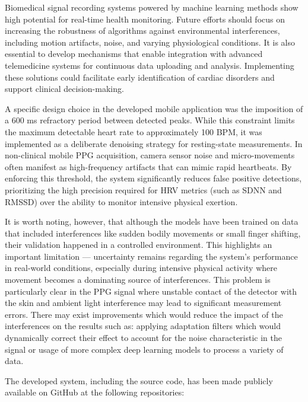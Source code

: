 \documentclass{citask}
\begin{document}
Biomedical signal recording systems powered by machine learning methods show high potential for real-time health monitoring. Future efforts should focus on increasing the robustness of algorithms against environmental interferences, including motion artifacts, noise, and varying physiological conditions. It is also essential to develop mechanisms that enable integration with advanced telemedicine systems for continuous data uploading and analysis. Implementing these solutions could facilitate early identification of cardiac disorders and support clinical decision-making.

A specific design choice in the developed mobile application was the imposition of a 600 ms refractory period between detected peaks. While this constraint limits the maximum detectable heart rate to approximately 100 BPM, it was implemented as a deliberate denoising strategy for resting-state measurements. In non-clinical mobile PPG acquisition, camera sensor noise and micro-movements often manifest as high-frequency artifacts that can mimic rapid heartbeats. By enforcing this threshold, the system significantly reduces false positive detections, prioritizing the high precision required for HRV metrics (such as SDNN and RMSSD) over the ability to monitor intensive physical exertion.

It is worth noting, however, that although the models have been trained on data that included interferences like sudden bodily movements or small finger shifting, their validation happened in a controlled environment. This highlights an important limitation — uncertainty remains regarding the system’s performance in real-world conditions, especially during intensive physical activity where movement becomes a dominating source of interferences. This problem is particularly clear in the PPG signal where unstable contact of the detector with the skin and ambient light interference may lead to significant measurement errors. There may exist improvements which would reduce the impact of the interferences on the results such as: applying adaptation filters which would dynamically correct their effect to account for the noise characteristic in the signal or usage of more complex deep learning models to process a variety of data.


The developed system, including the source code, has been made publicly available on GitHub at the following repositories:
\end{document}
